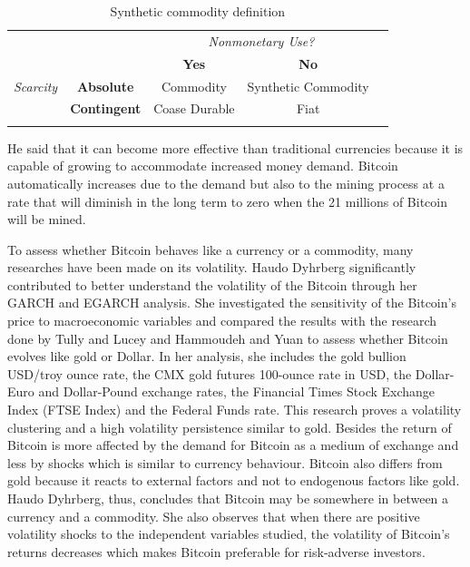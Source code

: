 \documentclass[11pt]{report}
\begin{document}
\begin{table}[!h]
\centering
\begin{tabular}{llccl}
                                      &                                          & \multicolumn{2}{c}{\textit{Nonmonetary Use?}}                                 &  \\
                                      &                                          & \textbf{Yes}                       & \textbf{No}                              &  \\ \cline{3-4}
\multicolumn{1}{c}{\textit{Scarcity}} & \multicolumn{1}{c|}{\textbf{Absolute}}   & \multicolumn{1}{c|}{Commodity}     & \multicolumn{1}{c|}{Synthetic Commodity} &  \\ \cline{3-4}
                                      & \multicolumn{1}{c|}{\textbf{Contingent}} & \multicolumn{1}{c|}{Coase Durable} & \multicolumn{1}{c|}{Fiat}                &  \\ \cline{3-4}
                                      &                                          & \multicolumn{1}{l}{}               & \multicolumn{1}{l}{}                     & 
\end{tabular}
\caption{Synthetic commodity definition \cite{SELGIN}}
\label{SYNTHETIC}
\end{table}

He said that it can become more effective than traditional currencies because it is capable of growing to accommodate increased money demand. Bitcoin automatically increases due to the demand but also to the mining process at a rate that will diminish in the long term to zero when the 21 millions of Bitcoin will be mined. \newline

To assess whether Bitcoin behaves like a currency or a commodity, many researches have been made on its volatility. Haudo Dyhrberg \cite{HAUDO2}significantly contributed to better understand the volatility of the Bitcoin through her GARCH and EGARCH analysis. She investigated the sensitivity of the Bitcoin’s price to macroeconomic variables and compared the results with the research done by Tully and Lucey \cite{TULLY} and Hammoudeh and Yuan \cite{HAMMOUDEH} to assess whether Bitcoin evolves like gold or Dollar. In her analysis, she includes the gold bullion USD/troy ounce rate, the CMX gold futures 100-ounce rate in USD, the Dollar-Euro and Dollar-Pound exchange rates, the Financial Times Stock Exchange Index (FTSE Index) and the Federal Funds rate. This research proves a volatility clustering and a high volatility persistence similar to gold. Besides the return of Bitcoin is more affected by the demand for Bitcoin as a medium of exchange and less by shocks which is similar to currency behaviour. Bitcoin also differs from gold because it reacts to external factors and not to endogenous factors like gold. Haudo Dyhrberg, thus, concludes that Bitcoin may be somewhere in between a currency and a commodity. She also observes that when there are positive volatility shocks to the independent variables studied, the volatility of Bitcoin’s returns decreases which makes Bitcoin preferable for risk-adverse investors. \clearpage
\end{document}
